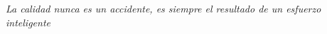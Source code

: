 \thispagestyle{empty}
%
\vspace*{6cm}
\hfill
\parbox{8cm}{
{\em La calidad nunca es un accidente, es siempre el resultado de un esfuerzo
inteligente}

\mbox{}
 
}

